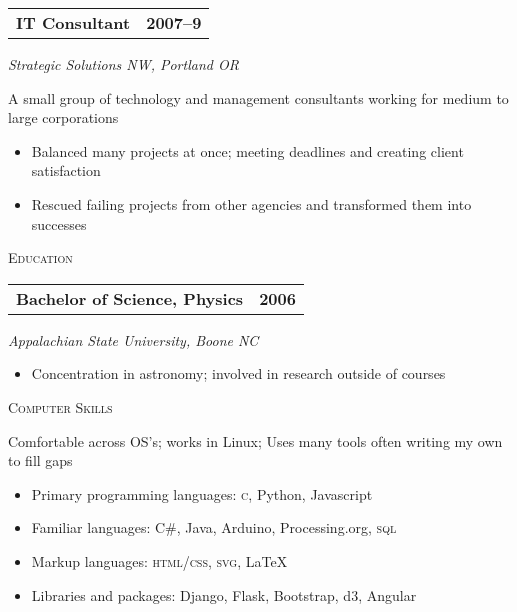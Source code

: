 \documentclass[letterpaper,10pt]{article}
\makeatletter
\newcommand{\resumeheader}[1]{
  \vspace{0.08in}
  \textsc{\Large #1}
  \vspace{0.10in}
}
\newcommand{\resumeitem}[4]{
  {\addtolength{\leftskip}{0.21in}
    \begin{tabular*}{6.25in}{l@{\extracolsep{\fill}} r}
      {\textbf{#1}} & {\textbf{#2}} \\
    \end{tabular*}
    
  }
  
  \vspace{0.01in}
  {\addtolength{\leftskip}{0.3in}
    \textit{#3}\par
  }
  
  \vspace{0.07in}
  {\addtolength{\leftskip}{0.3in}
    \small
    \begin{minipage}{5in}
      #4
    \end{minipage}
    
  }
  \vspace{0.15in}
}
\makeatother
\begin{document}
\resumeitem{IT Consultant}{2007--9}%
           {Strategic Solutions NW, Portland OR}%
           {
              A small group of technology and management consultants working for medium to large corporations
              \begin{itemize}[topsep=1pt, itemsep=0pt, parsep=0pt]
                \renewcommand{\labelitemi}{---}
                \item Balanced many projects at once; meeting deadlines and creating client satisfaction
                \item Rescued failing projects from other agencies and transformed them into successes
              \end{itemize}
           }

\resumeheader{Education}

\resumeitem{Bachelor of Science, Physics} {2006}%
           {Appalachian State University, Boone NC}%
           {
              \begin{itemize}[topsep=1pt, itemsep=0pt, parsep=0pt]
                \renewcommand{\labelitemi}{---}
                \item Concentration in astronomy; involved in research outside of courses
              \end{itemize}
           }

\resumeheader{Computer Skills} 

Comfortable across OS's; works in Linux; Uses many tools often writing my own to fill gaps
\small
\begin{itemize}[topsep=1pt, itemsep=0pt, parsep=0pt]
  \renewcommand{\labelitemi}{---}
  \item Primary programming languages: \textsc{c}, Python, Javascript
  \item Familiar languages: C\#, Java, Arduino, Processing.org, \textsc{sql}
  \item Markup languages: \textsc{html}/\textsc{css}, \textsc{svg}, \LaTeX
  \item Libraries and packages: Django, Flask, Bootstrap, d3, Angular
\end{itemize}
\end{document}
